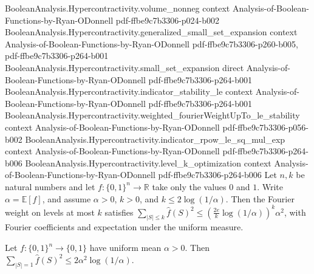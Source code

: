 \begin{theorem}
\proofstep
  {BooleanAnalysis.Hypercontractivity.volume_nonneg}
  {context}
  {Analysis-of-Boolean-Functions-by-Ryan-ODonnell}
  {pdf-ffbe9c7b3306-p024-b002}
\proofstep
  {BooleanAnalysis.Hypercontractivity.generalized_small_set_expansion}
  {context}
  {Analysis-of-Boolean-Functions-by-Ryan-ODonnell}
  {pdf-ffbe9c7b3306-p260-b005,
    pdf-ffbe9c7b3306-p264-b001}
\proofstep
  {BooleanAnalysis.Hypercontractivity.small_set_expansion}
  {direct}
  {Analysis-of-Boolean-Functions-by-Ryan-ODonnell}
  {pdf-ffbe9c7b3306-p264-b001}
\proofstep
  {BooleanAnalysis.Hypercontractivity.indicator_stability_le}
  {context}
  {Analysis-of-Boolean-Functions-by-Ryan-ODonnell}
  {pdf-ffbe9c7b3306-p264-b001}
\proofstep
  {BooleanAnalysis.Hypercontractivity.weighted_fourierWeightUpTo_le_stability}
  {context}
  {Analysis-of-Boolean-Functions-by-Ryan-ODonnell}
  {pdf-ffbe9c7b3306-p056-b002}
\proofstep
  {BooleanAnalysis.Hypercontractivity.indicator_rpow_le_sq_mul_exp}
  {context}
  {Analysis-of-Boolean-Functions-by-Ryan-ODonnell}
  {pdf-ffbe9c7b3306-p264-b006}
\proofstep
  {BooleanAnalysis.Hypercontractivity.level_k_optimization}
  {context}
  {Analysis-of-Boolean-Functions-by-Ryan-ODonnell}
  {pdf-ffbe9c7b3306-p264-b006}
Let $n,k$ be natural numbers and let $f:\{0,1\}^n\to\mathbb R$ take only the values $0$
and $1$. Write $\alpha=\mathbb E[f]$, and assume $\alpha>0$, $k>0$, and
$k\le2\log(1/\alpha)$. Then the Fourier weight on levels at most $k$ satisfies
$\sum_{|S|\le k}\widehat f(S)^2\le\left(\frac{2e}{k}\log(1/\alpha)\right)^k\alpha^2$,
with Fourier coefficients and expectation under the uniform measure.
\end{theorem}

\begin{theorem}
\leanok
{}
Let $f:\{0,1\}^n\to\{0,1\}$ have uniform mean $\alpha>0$. Then $\sum_{|S|=1}\widehat f(S)^2\le2\alpha^2\log(1/\alpha)$.
\end{theorem}
